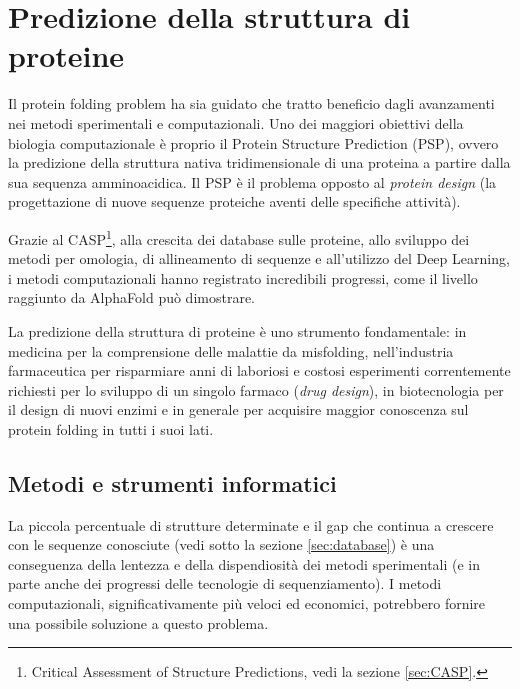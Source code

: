 \chapter{Predizione della struttura di proteine}

Il protein folding problem ha sia guidato che tratto beneficio dagli avanzamenti nei metodi sperimentali e computazionali\supercite{dill2008protein}. Uno dei maggiori obiettivi della biologia computazionale è proprio il Protein Structure Prediction (PSP), ovvero la predizione della struttura nativa tridimensionale di una proteina a partire dalla sua sequenza amminoacidica. Il PSP è il problema opposto al \textit{protein design} (la progettazione di nuove sequenze proteiche aventi delle specifiche attività).

\par Grazie al CASP\footnote{Critical Assessment of Structure Predictions, vedi la sezione \ref{sec:CASP}.}, alla crescita dei database sulle proteine, allo sviluppo dei metodi per omologia, di allineamento di sequenze e all'utilizzo del Deep Learning, i metodi computazionali hanno registrato incredibili progressi, come il livello raggiunto da AlphaFold può dimostrare. 

\par La predizione della struttura di proteine è uno strumento fondamentale: in medicina per la comprensione delle malattie da misfolding, nell'industria farmaceutica per risparmiare anni di laboriosi e costosi esperimenti correntemente richiesti per lo sviluppo di un singolo farmaco (\textit{drug design}), in biotecnologia per il design di nuovi enzimi e in generale per acquisire maggior conoscenza sul protein folding in tutti i suoi lati.

\section{Metodi e strumenti informatici}

La piccola percentuale di strutture determinate e il gap che continua a crescere con le sequenze conosciute (vedi sotto la sezione \ref{sec:database}) è una conseguenza della lentezza e della dispendiosità dei metodi sperimentali (e in parte anche dei progressi delle tecnologie di sequenziamento). I metodi computazionali, significativamente più veloci ed economici, potrebbero fornire una possibile soluzione a questo problema.


